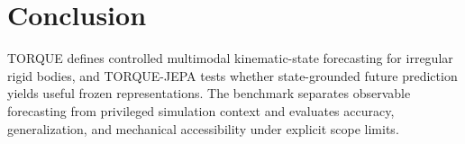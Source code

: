 \documentclass{article}
\begin{document}
\section{Conclusion}

TORQUE defines controlled multimodal kinematic-state forecasting for irregular rigid bodies, and TORQUE-JEPA tests whether state-grounded future prediction yields useful frozen representations. The benchmark separates observable forecasting from privileged simulation context and evaluates accuracy, generalization, and mechanical accessibility under explicit scope limits.



\end{document}

